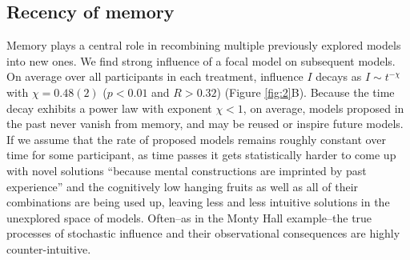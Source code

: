 \subsection{Recency of memory}
Memory plays a central role in recombining multiple previously explored models into new ones. We find strong influence of a focal model on subsequent models. On average over all participants in each treatment, influence $I$ decays as $I \sim t^{-\chi}$ with $\chi = 0.48(2)$ ($p < 0.01$ and $R > 0.32$)  (Figure \ref{fig:2}B). Because the time decay exhibits a power law with exponent $\chi < 1$, on average, models proposed in the past never vanish from memory, and may be reused or inspire future models. If we assume that the rate of proposed models remains roughly constant  over time for some participant, as time passes it gets statistically harder to come up with novel solutions ``because mental constructions are imprinted by past experience'' and the cognitively low hanging fruits as well as all of their combinations are being used up, leaving less and less intuitive solutions in the unexplored space of models. Often--as in the Monty Hall example--the true processes of stochastic influence and their observational consequences are highly counter-intuitive.  


